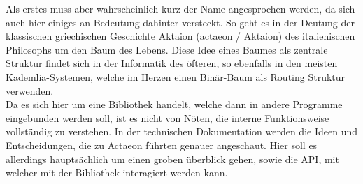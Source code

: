 \documentclass[11pt]{article}
\begin{document}
\noindent Als erstes muss aber wahrscheinlich kurz der Name
angesprochen werden, da sich auch hier einiges an Bedeutung dahinter
versteckt. So geht es in der Deutung der klassischen griechischen
Geschichte Aktaion (actaeon / Aktaion) des italienischen Philosophs um
den Baum des Lebens. Diese Idee eines Baumes als zentrale Struktur
findet sich in der Informatik des öfteren, so ebenfalls in den meisten
Kademlia-Systemen, welche im Herzen einen Binär-Baum als Routing
Struktur verwenden.\\

\noindent Da es sich hier um eine Bibliothek handelt, welche dann in
andere Programme eingebunden werden soll, ist es nicht von Nöten, die
interne Funktionsweise vollständig zu verstehen. In der technischen
Dokumentation werden die Ideen und Entscheidungen, die zu Actaeon
führten genauer angeschaut. Hier soll es allerdings hauptsächlich
um einen groben überblick gehen, sowie die API, mit welcher mit der
Bibliothek interagiert werden kann.\\
\end{document}
